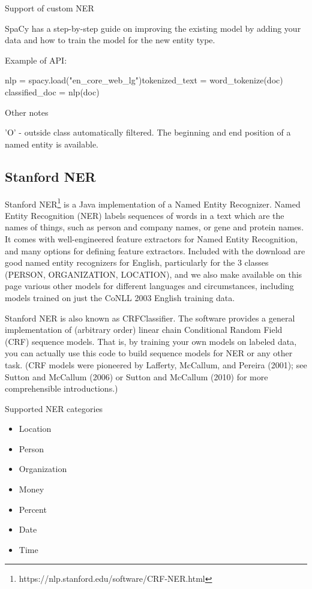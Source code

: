 \documentclass[conference]{IEEEtran}
\begin{document}
Support of custom NER

SpaCy has a step-by-step guide on improving the existing model by adding your data and how to train the model for the new entity type.

Example of API:

\begin{verbatimtab}[4]
nlp = spacy.load("en_core_web_lg")tokenized_text = word_tokenize(doc)
classified_doc = nlp(doc)
\end{verbatimtab}

Other notes

'O' - outside class automatically filtered. The beginning and end position of a named entity is available.

\subsection{Stanford NER}

Stanford NER\footnote{https://nlp.stanford.edu/software/CRF-NER.html}  is a Java implementation of a Named Entity Recognizer. Named Entity Recognition (NER) labels sequences of words in a text which are the names of things, such as person and company names, or gene and protein names. It comes with well-engineered feature extractors for Named Entity Recognition, and many options for defining feature extractors. Included with the download are good named entity recognizers for English, particularly for the 3 classes (PERSON, ORGANIZATION, LOCATION), and we also make available on this page various other models for different languages and circumstances, including models trained on just the CoNLL 2003 English training data.

Stanford NER is also known as CRFClassifier. The software provides a general implementation of (arbitrary order) linear chain Conditional Random Field (CRF) sequence models. That is, by training your own models on labeled data, you can actually use this code to build sequence models for NER or any other task. (CRF models were pioneered by Lafferty, McCallum, and Pereira (2001); see Sutton and McCallum (2006) or Sutton and McCallum (2010) for more comprehensible introductions.)

Supported NER categories

\begin{itemize}
	\item Location
	\item Person
	\item Organization
	\item Money
	\item Percent
	\item Date
	\item Time
\end{itemize}
\end{document}

